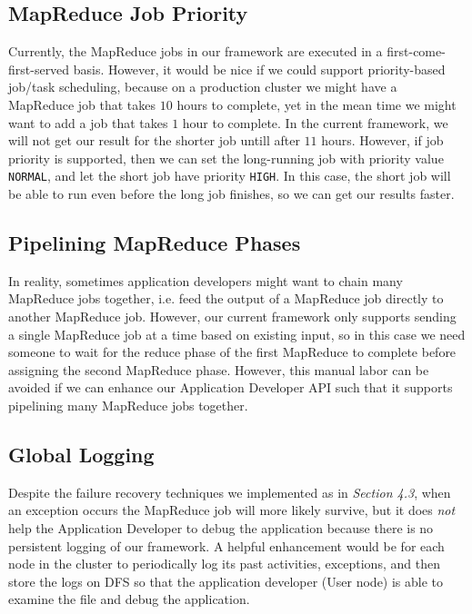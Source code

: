 \documentclass{article} %
\begin{document}
\subsection{MapReduce Job Priority}
    \par\qquad Currently, the MapReduce jobs in our framework are executed in a first-come-first-served basis. However, it would be nice if we could support priority-based job/task scheduling, because on a production cluster we might have a MapReduce job that takes $10$ hours to complete, yet in the mean time we might want to add a job that takes $1$ hour to complete. In the current framework, we will not get our result for the shorter job untill after $11$ hours. However, if job priority is supported, then we can set the long-running job with priority value \texttt{NORMAL}, and let the short job have priority \texttt{HIGH}. In this case, the short job will be able to run even before the long job finishes, so we can get our results faster.
    
\subsection{Pipelining MapReduce Phases}
    \par\qquad In reality, sometimes application developers might want to chain many MapReduce jobs together, i.e. feed the output of a MapReduce job directly to another MapReduce job. However, our current framework only supports sending a single MapReduce job at a time based on existing input, so in this case we need someone to wait for the reduce phase of the first MapReduce to complete before assigning the second MapReduce phase. However, this manual labor can be avoided if we can enhance our Application Developer API such that it supports pipelining many MapReduce jobs together.

\subsection{Global Logging}
    \par\qquad Despite the failure recovery techniques we implemented as in \emph{Section 4.3}, when an exception occurs the MapReduce job will more likely survive, but it does \emph{not} help the Application Developer to debug the application because there is no persistent logging of our framework. A helpful enhancement would be for each node in the cluster to periodically log its past activities, exceptions, and then store the logs on DFS so that the application developer (User node) is able to examine the file and debug the application.

\end{document}
